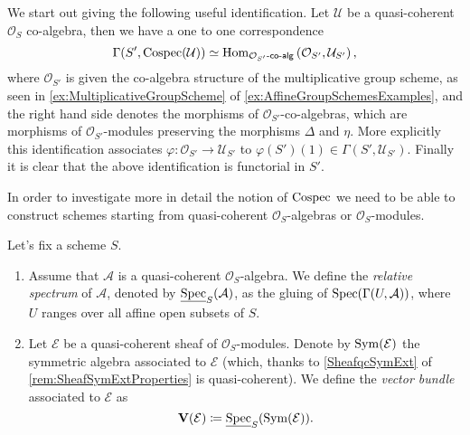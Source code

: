 \begin{rem}[]\label{rem:CospecSections}
	We start out giving the following useful identification.
	Let $\mathcal{U}$ be a quasi-coherent $\mathcal{O}_{ S }$ co-algebra,
	then we have a one to one correspondence
	\begin{equation*}
	\Gamma(S', \operatorname{Cospec}(\mathcal{U})) \simeq
	\operatorname{Hom}_{ \mathcal{O}_{ S' }\text{-}\mathsf{co}\text{-}\mathsf{alg}} 
	\left( \mathcal{O}_{ S' }, \mathcal{U}_{S'} \right)
	,\end{equation*}
	where $\mathcal{O}_{ S' }$ is given the co-algebra structure 
	of the multiplicative group scheme, as seen in
	\cref{ex:MultiplicativeGroupScheme} of \cref{ex:AffineGroupSchemesExamples},
	and the right hand side denotes the morphisms of 
	$\mathcal{O}_{ S' }$-co-algebras, which are
	morphisms of \(\mathcal{O}_{ S' }\)-modules
	preserving the morphisms $\Delta$ and \(\eta\).
	More explicitly this identification associates
	$\varphi\colon \mathcal{O}_{ S' } \to \mathcal{U}_{S'}$ to
	$\varphi(S')(1) \in \Gamma(S', \mathcal{U}_{S'})$.
	Finally it is clear that the above identification is functorial in $S'$.
\end{rem}


\noindent
In order to investigate more in detail the notion of $\operatorname{Cospec}$ we need to 
be able to construct schemes starting from quasi-coherent $\mathcal{O}_{ S }$-algebras
or $\mathcal{O}_{ S }$-modules.


\begin{defn}
	Let's fix a scheme $S$.
\begin{enumerate}
	\item Assume that $\mathcal{A}$ is a quasi-coherent $\mathcal{O}_{ S }$-algebra.
		We define the \emph{relative spectrum} of $\mathcal{A}$, denoted by
		$\underline{\operatorname{Spec}}_S(\mathcal{A})$, as the gluing of
		$\operatorname{Spec}(\Gamma(U, \mathcal{A}))$, where $U$ ranges
		over all affine open subsets of $S$.

	\item  Let $\mathcal{E}$ be a quasi-coherent sheaf of $\mathcal{O}_{ S }$-modules.
		Denote by $\operatorname{Sym}(\mathcal{E})$ the symmetric algebra associated to 
		$\mathcal{E}$ (which, thanks to \cref{SheafqcSymExt} of
		\cref{rem:SheafSymExtProperties} is quasi-coherent).
		We define the \emph{vector bundle} associated to $\mathcal{E}$ as
		\begin{equation*}
			\mathbf{V}(\mathcal{E}) \coloneqq
			\underline{\operatorname{Spec}}_S (\operatorname{Sym}(\mathcal{E}))
		.\end{equation*}
\end{enumerate}
\end{defn}


